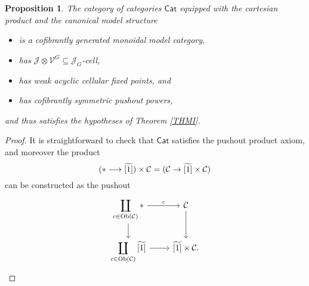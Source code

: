 \documentclass[a4paper,10pt
,draft
]{article}%
\numberwithin{equation}{section}
\numberwithin{figure}{section}
\newtheorem{proposition}[equation]{Proposition}%
\theoremstyle{definition} %
\newcommand{\longto}{\longrightarrow}%
\newcommand{\Cat}{\mathsf{Cat}}
\newcommand{\V}{\ensuremath{\mathcal V}}
\newcommand{\1}{\ensuremath{\mathbbm 1}}%
\begin{document}
\begin{proposition}
      The category of categories $\Cat$ equipped with the cartesian product and the canonical model structure
      \begin{itemize}
      \item is a cofibrantly generated monoidal model category,
      \item has $\mathcal J \otimes \V^G \subseteq \mathcal J_G$-cell,
      \item has weak acyclic cellular fixed points, and
      \item has cofibrantly symmetric pushout powers,
      \end{itemize}      
      and thus satisfies the hypotheses of Theorem \ref{THMI}.
\end{proposition}
\begin{proof}
      It is straightforward to check that $\Cat$ satisfies the pushout product axiom,
      and moreover the product
      \[
            (\** \longto \widetilde{[1]}) \times \mathcal C = (\mathcal C \to \widetilde{[1]} \times \mathcal C)
      \]
      can be constructed as the pushout
      \[
            \begin{tikzcd}
                  \displaystyle{
                    \coprod_{c \in \mathrm{Ob}(\mathcal C)} \**
                  }
                  \arrow[r, "c"] \arrow[d]
                  &
                  \mathcal C \arrow[d]
                  \\
                  \displaystyle{
                    \coprod_{c \in \mathrm{Ob}(\mathcal C)} \widetilde{[1]}
                  }
                  \arrow[r]
                  &
                  \widetilde{[1]} \times \mathcal C.
            \end{tikzcd}
      \]


\end{proof}
\end{document}
